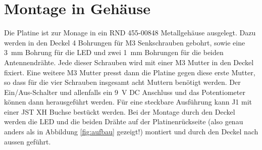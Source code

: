 \documentclass[a4paper,11pt,halfparskip,smallheadings,DIV=10]{scrartcl}
\begin{document}
\section{Montage in Gehäuse}
Die Platine ist zur Monage in ein RND 455-00848 Metallgehäuse ausgelegt. Dazu
werden in den Deckel 4 Bohrungen für M3 Senkschrauben gebohrt, sowie eine 3~mm
Bohrung für die LED und zwei 1~mm Bohrungen für die beiden Antennendrähte. Jede
dieser Schrauben wird mit einer M3 Mutter in den Deckel fixiert. Eine weitere
M3 Mutter presst dann die Platine gegen diese erste Mutter, so dass für die
vier Schrauben insgesamt acht Muttern benötigt werden.
Der Ein/Aus-Schalter und allenfalls ein 9~V DC Anschluss und das Potentiometer
können dann herausgeführt werden. Für eine steckbare Ausführung kann J1
mit einer JST XH Buchse bestückt werden. Bei der Montage durch den Deckel
werden die LED und die beiden Drähte auf der Platinenrückseite (also genau
anders als in Abbildung \ref{fig:aufbau} gezeigt!) montiert und durch den
Deckel nach aussen geführt.
\end{document}
